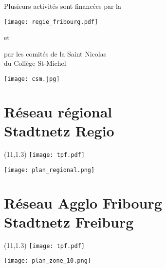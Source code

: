 \cleardoublepage

\begin{center}
{\Huge Plusieurs activités sont financées par la}
\vspace*{5mm}
\par
\texttt{[image: regie\_fribourg.pdf]}
\end{center}

\vfill
\begin{center}
	{\Huge et}
\end{center}
\vfill

\begin{center}
{\Huge par les comités de la Saint Nicolas\vspace*{1mm}\\
du Collège St-Michel}
\vspace*{5mm}
\par
\texttt{[image: csm.jpg]}
\end{center}


\clearpage
\thispagestyle{empty}%
\clearpage
\section*{Réseau régional\\Stadtnetz Regio}
\begin{textblock}{2}(11,1.3)
\texttt{[image: tpf.pdf]}
\end{textblock}
\begin{center}
\texttt{[image: plan\_regional.png]}
\end{center}
\clearpage%
\thispagestyle{empty}%
\section*{Réseau Agglo Fribourg\\Stadtnetz Freiburg}%
\begin{textblock}{2}(11,1.3)%
\texttt{[image: tpf.pdf]}%
\end{textblock}%
\begin{center}
\texttt{[image: plan\_zone\_10.png]}
\end{center}
